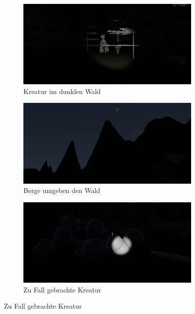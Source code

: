 \begin{figure}
\centering
\begin{subfigure}[b]{0.75\textwidth}
   \includegraphics[width=1\linewidth]{resources/img/game_screenshot_1.png}
   \caption{Kreatur im dunklen Wald}
   \label{fig:game_screenshot_1} 
\end{subfigure}

\begin{subfigure}[b]{0.75\textwidth}
   \includegraphics[width=1\linewidth]{resources/img/game_screenshot_2.png}
   \caption{Berge umgeben den Wald}
   \label{fig:game_screenshot_2}
\end{subfigure}

\begin{subfigure}[b]{0.75\textwidth}
   \includegraphics[width=1\linewidth]{resources/img/game_screenshot_3.png}
   \caption{Zu Fall gebrachte Kreatur}
   \label{fig:game_screenshot_3}
\end{subfigure}

\end{figure}

